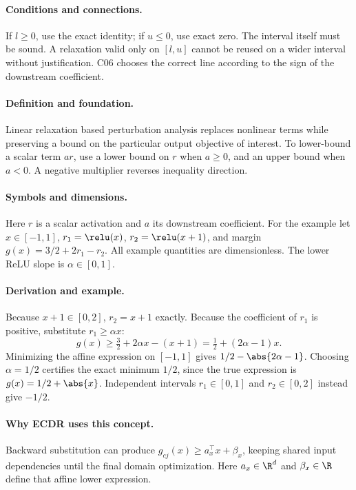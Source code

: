 \paragraph{Conditions and connections.}
If $l\ge0$, use the exact identity; if $u\le0$, use exact zero. The interval itself must be sound. A relaxation valid only on $[l,u]$ cannot be reused on a wider interval without justification. C06 chooses the correct line according to the sign of the downstream coefficient.

\paragraph{Definition and foundation.}
Linear relaxation based perturbation analysis replaces nonlinear terms while preserving a bound on the particular output objective of interest. To lower-bound a scalar term $a r$, use a lower bound on $r$ when $a\ge0$, and an upper bound when $a<0$. A negative multiplier reverses inequality direction.
\paragraph{Symbols and dimensions.}
Here $r$ is a scalar activation and $a$ its downstream coefficient. For the example let $x\in[-1,1]$, $r_1=\relu(x)$, $r_2=\relu(x+1)$, and margin $g(x)=3/2+2r_1-r_2$. All example quantities are dimensionless. The lower ReLU slope is $\alpha\in[0,1]$.
\paragraph{Derivation and example.}
Because $x+1\in[0,2]$, $r_2=x+1$ exactly. Because the coefficient of $r_1$ is positive, substitute $r_1\ge\alpha x$:
\[
 g(x)\ge\tfrac32+2\alpha x-(x+1)
 =\tfrac12+(2\alpha-1)x.
\]
Minimizing the affine expression on $[-1,1]$ gives $1/2-\abs{2\alpha-1}$. Choosing $\alpha=1/2$ certifies the exact minimum $1/2$, since the true expression is $g(x)=1/2+\abs{x}$. Independent intervals $r_1\in[0,1]$ and $r_2\in[0,2]$ instead give $-1/2$.
\paragraph{Why ECDR uses this concept.}
Backward substitution can produce $g_{cj}(x)\ge a_x^\top x+\beta_x$, keeping shared input dependencies until the final domain optimization. Here $a_x\in\R^d$ and $\beta_x\in\R$ define that affine lower expression.
